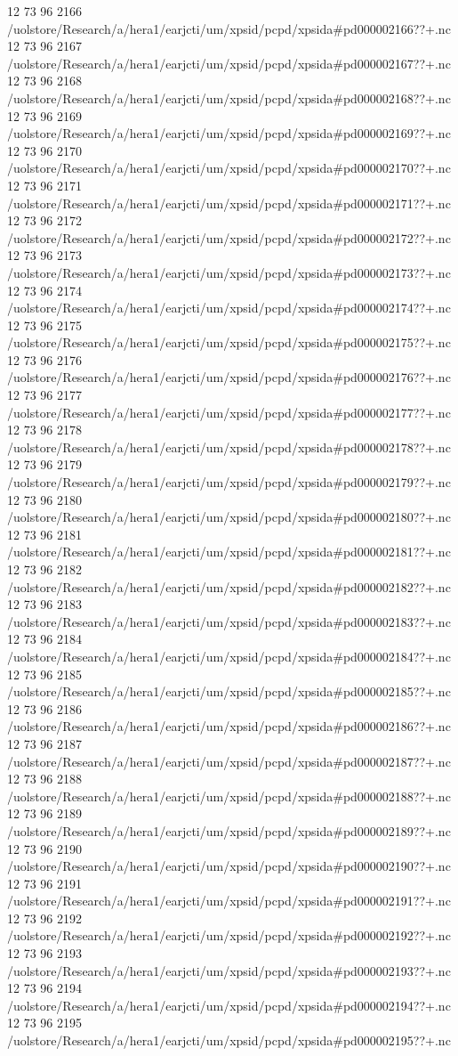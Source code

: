 12 73 96
2166
/uolstore/Research/a/hera1/earjcti/um/xpsid/pcpd/xpsida#pd000002166??+.nc
12 73 96
2167
/uolstore/Research/a/hera1/earjcti/um/xpsid/pcpd/xpsida#pd000002167??+.nc
12 73 96
2168
/uolstore/Research/a/hera1/earjcti/um/xpsid/pcpd/xpsida#pd000002168??+.nc
12 73 96
2169
/uolstore/Research/a/hera1/earjcti/um/xpsid/pcpd/xpsida#pd000002169??+.nc
12 73 96
2170
/uolstore/Research/a/hera1/earjcti/um/xpsid/pcpd/xpsida#pd000002170??+.nc
12 73 96
2171
/uolstore/Research/a/hera1/earjcti/um/xpsid/pcpd/xpsida#pd000002171??+.nc
12 73 96
2172
/uolstore/Research/a/hera1/earjcti/um/xpsid/pcpd/xpsida#pd000002172??+.nc
12 73 96
2173
/uolstore/Research/a/hera1/earjcti/um/xpsid/pcpd/xpsida#pd000002173??+.nc
12 73 96
2174
/uolstore/Research/a/hera1/earjcti/um/xpsid/pcpd/xpsida#pd000002174??+.nc
12 73 96
2175
/uolstore/Research/a/hera1/earjcti/um/xpsid/pcpd/xpsida#pd000002175??+.nc
12 73 96
2176
/uolstore/Research/a/hera1/earjcti/um/xpsid/pcpd/xpsida#pd000002176??+.nc
12 73 96
2177
/uolstore/Research/a/hera1/earjcti/um/xpsid/pcpd/xpsida#pd000002177??+.nc
12 73 96
2178
/uolstore/Research/a/hera1/earjcti/um/xpsid/pcpd/xpsida#pd000002178??+.nc
12 73 96
2179
/uolstore/Research/a/hera1/earjcti/um/xpsid/pcpd/xpsida#pd000002179??+.nc
12 73 96
2180
/uolstore/Research/a/hera1/earjcti/um/xpsid/pcpd/xpsida#pd000002180??+.nc
12 73 96
2181
/uolstore/Research/a/hera1/earjcti/um/xpsid/pcpd/xpsida#pd000002181??+.nc
12 73 96
2182
/uolstore/Research/a/hera1/earjcti/um/xpsid/pcpd/xpsida#pd000002182??+.nc
12 73 96
2183
/uolstore/Research/a/hera1/earjcti/um/xpsid/pcpd/xpsida#pd000002183??+.nc
12 73 96
2184
/uolstore/Research/a/hera1/earjcti/um/xpsid/pcpd/xpsida#pd000002184??+.nc
12 73 96
2185
/uolstore/Research/a/hera1/earjcti/um/xpsid/pcpd/xpsida#pd000002185??+.nc
12 73 96
2186
/uolstore/Research/a/hera1/earjcti/um/xpsid/pcpd/xpsida#pd000002186??+.nc
12 73 96
2187
/uolstore/Research/a/hera1/earjcti/um/xpsid/pcpd/xpsida#pd000002187??+.nc
12 73 96
2188
/uolstore/Research/a/hera1/earjcti/um/xpsid/pcpd/xpsida#pd000002188??+.nc
12 73 96
2189
/uolstore/Research/a/hera1/earjcti/um/xpsid/pcpd/xpsida#pd000002189??+.nc
12 73 96
2190
/uolstore/Research/a/hera1/earjcti/um/xpsid/pcpd/xpsida#pd000002190??+.nc
12 73 96
2191
/uolstore/Research/a/hera1/earjcti/um/xpsid/pcpd/xpsida#pd000002191??+.nc
12 73 96
2192
/uolstore/Research/a/hera1/earjcti/um/xpsid/pcpd/xpsida#pd000002192??+.nc
12 73 96
2193
/uolstore/Research/a/hera1/earjcti/um/xpsid/pcpd/xpsida#pd000002193??+.nc
12 73 96
2194
/uolstore/Research/a/hera1/earjcti/um/xpsid/pcpd/xpsida#pd000002194??+.nc
12 73 96
2195
/uolstore/Research/a/hera1/earjcti/um/xpsid/pcpd/xpsida#pd000002195??+.nc
